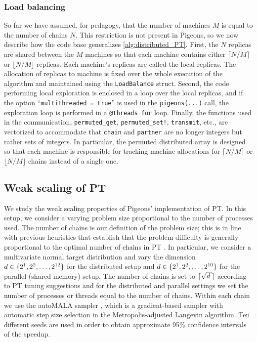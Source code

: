\subsubsection{Load balancing}
\label{sec:relax}

So far we have assumed, for pedagogy, that the number of 
machines $M$ is equal to the number of chains $N$.
This restriction is not present in Pigeons, so we now describe how 
the code base generalizes \cref{alg:distributed_PT}. 
First, the $N$ replicas are shared between the $M$ machines so that 
each machine contains either $\lceil N/M \rceil$ or $\lfloor N/M \rfloor$ 
replicas. Each machine's replicas are called the local replicas. 
The allocation of replicas to machine is fixed over the whole execution of the 
algorithm and maintained using the \texttt{LoadBalance} struct. 
Second, the code performing local exploration is enclosed in a 
loop over the local replicas, and if the option ``\texttt{multithreaded = true}'' 
is used in the \texttt{pigeons(...)} call, the exploration loop is performed in a 
\texttt{@threads for} loop. 
Finally, the functions used in the communication, 
\texttt{permuted\_get}, \texttt{permuted\_set!}, \texttt{transmit}, etc., 
are vectorized to accommodate that \texttt{chain} and 
\texttt{partner} are no longer integers but rather sets of integers. 
In particular, the permuted distributed array is designed so that each 
machine is responsible for tracking machine allocations for 
$\lceil N/M \rceil$ or $\lfloor N/M \rfloor$ chains instead of a single one.


\subsection{Weak scaling of PT}

We study the weak scaling properties of Pigeons' implementation of PT.
In this setup, we consider a varying problem size proportional to the number of processes used. 
The number of chains is our definition of the problem size; 
this is in line with previous heuristics that establish that the problem 
difficulty is generally proportional to the optimal number of chains in PT \cite{syed2021nrpt}.
In particular, we consider a multivariate normal target distribution 
and vary the dimension $d \in \cbra{2^1, 2^2, \ldots, 2^{12}}$ for the distributed setup and 
$d \in \cbra{2^1, 2^2, \ldots, 2^{10}}$ for the parallel (shared memory) setup. 
The number of chains is set to $\ceil{\sqrt{d}}$ according to PT tuning suggestions \cite{syed2021nrpt} 
and for the distributed and parallel settings we set the number of processes or threads equal 
to the number of chains.
Within each chain we use the autoMALA sampler \cite{biron2024automala}, which is a 
gradient-based sampler with automatic step size selection in the Metropolis-adjusted Langevin algorithm.
Ten different seeds are used in order to obtain approximate 95\% confidence intervals of 
the speedup.

